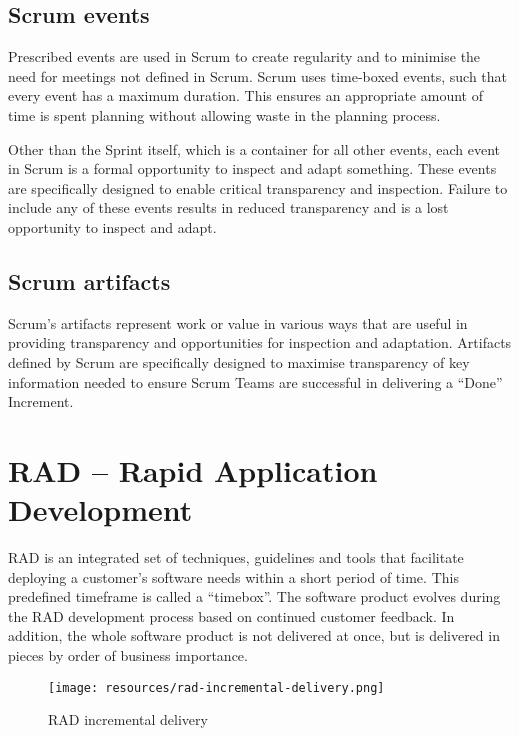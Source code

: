 \subsection{Scrum events}

Prescribed events are used in Scrum to create regularity and to minimise the need for meetings not defined in Scrum. Scrum uses time-boxed events, such that every event has a maximum duration. This ensures an appropriate amount of time is spent planning without allowing waste in the planning process.

Other than the Sprint itself, which is a container for all other events, each event in Scrum is a formal opportunity to inspect and adapt something. These events are specifically designed to enable critical transparency and inspection. Failure to include any of these events results in reduced transparency and is a lost opportunity to inspect and adapt.

\subsection{Scrum artifacts}

Scrum’s artifacts represent work or value in various ways that are useful in providing transparency and opportunities for inspection and adaptation. Artifacts defined by Scrum are specifically designed to maximise transparency of key information needed to ensure Scrum Teams are successful in delivering a ``Done'' Increment.

\section{RAD -- Rapid Application Development}

RAD is an integrated set of techniques, guidelines and tools that facilitate deploying a customer's software needs within a short period of time. This predefined timeframe is called a ``timebox''. The software product evolves during the RAD development process based on continued customer feedback. In addition, the whole software product is not delivered at once, but is delivered in pieces by order of business importance. \cite{gottesdiener}

\begin{figure}
	\centering
	\texttt{[image: resources/rad-incremental-delivery.png]}
	\caption[RAD incremental delivery]{RAD incremental delivery}
\end{figure}



